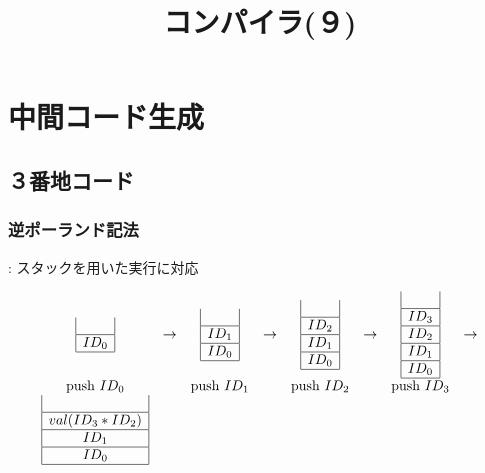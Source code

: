 \documentclass[dvipdfmx,cjk]{beamer}
\title{コンパイラ(９)}
\date{\lecturedate}
\begin{document}
\frame{\titlepage}

\section{中間コード生成}

\subsection{３番地コード}

\begin{frame} 
 \frametitle{逆ポーランド記法}
 :
 スタックを用いた実行に対応

 \[
  \begin{array}{cccccccc}
   \begin{array}{|c|}
    \ \\\hline
    ID_0\\\hline
   \end{array}
   & \rightarrow &
   \begin{array}{|c|}
    \ \\\hline
    ID_1\\\hline
    ID_0\\\hline
   \end{array}
   & \rightarrow &
   \begin{array}{|c|}
    \ \\\hline
    ID_2\\\hline
    ID_1\\\hline
    ID_0\\\hline
   \end{array}
   & \rightarrow &
   \begin{array}{|c|}
    \ \\\hline
    ID_3\\\hline
    ID_2\\\hline
    ID_1\\\hline
    ID_0\\\hline
   \end{array}
   & \rightarrow
   \\
   \mbox{push $ID_0$} & &
   \mbox{push $ID_1$} & &
   \mbox{push $ID_2$} & &
   \mbox{push $ID_3$}\\
   \begin{array}{|c|}
    \ \\\hline
    {\tiny val(ID_3*ID_2)}\\\hline
    ID_1\\\hline
    ID_0\\\hline
   \end{array}

\end{array}\]
\end{frame}
\end{document}
